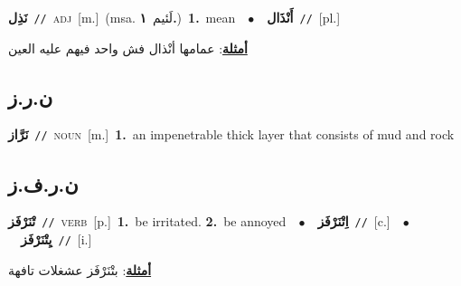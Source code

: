 \documentclass[10pt,a4paper,twoside]{article} %
\begin{document}
\begin{multicols}{2}
{\setlength\topsep{0pt}\textbf{\foreignlanguage{arabic}{نَذِل}}\ {\color{gray}\texttt{//}\color{black}}\ \textsc{adj}\ [m.]\ \color{gray}(msa. \foreignlanguage{arabic}{لَئيم}~\foreignlanguage{arabic}{\textbf{١.}})\color{black}\ \textbf{1.}~mean\ \ $\bullet$\ \ \setlength\topsep{0pt}\textbf{\foreignlanguage{arabic}{أَنْذَال}}\ {\color{gray}\texttt{//}\color{black}}\ [pl.]\  \begin{flushright}\color{gray}\foreignlanguage{arabic}{\textbf{\underline{\foreignlanguage{arabic}{أمثلة}}}: عمامها أنْذال فش واحد فيهم عليه العين}\end{flushright}\color{black}} \vspace{2mm}

\vspace{-3mm}
\subsection*{\color{blue}\foreignlanguage{arabic}{ن.ر.ز}\color{blue}{}} 

{\setlength\topsep{0pt}\textbf{\foreignlanguage{arabic}{نَرَّاز}}\ {\color{gray}\texttt{//}\color{black}}\ \textsc{noun}\ [m.]\ \textbf{1.}~an impenetrable thick layer that consists of mud and rock\ } \vspace{2mm}

\vspace{-3mm}
\subsection*{\color{blue}\foreignlanguage{arabic}{ن.ر.ف.ز}\color{blue}{}} 

{\setlength\topsep{0pt}\textbf{\foreignlanguage{arabic}{تْنَرْفَز}}\ {\color{gray}\texttt{//}\color{black}}\ \textsc{verb}\ [p.]\ \textbf{1.}~be irritated.  \textbf{2.}~be annoyed\ \ $\bullet$\ \ \setlength\topsep{0pt}\textbf{\foreignlanguage{arabic}{اِتْنَرْفَز}}\ {\color{gray}\texttt{//}\color{black}}\ [c.]\ \ $\bullet$\ \ \setlength\topsep{0pt}\textbf{\foreignlanguage{arabic}{يِتْنَرْفَز}}\ {\color{gray}\texttt{//}\color{black}}\ [i.]\  \begin{flushright}\color{gray}\foreignlanguage{arabic}{\textbf{\underline{\foreignlanguage{arabic}{أمثلة}}}: بتْنَرْفَز عشغلات تافهة}\end{flushright}\color{black}} \vspace{2mm}


\end{multicols}
\end{document}

